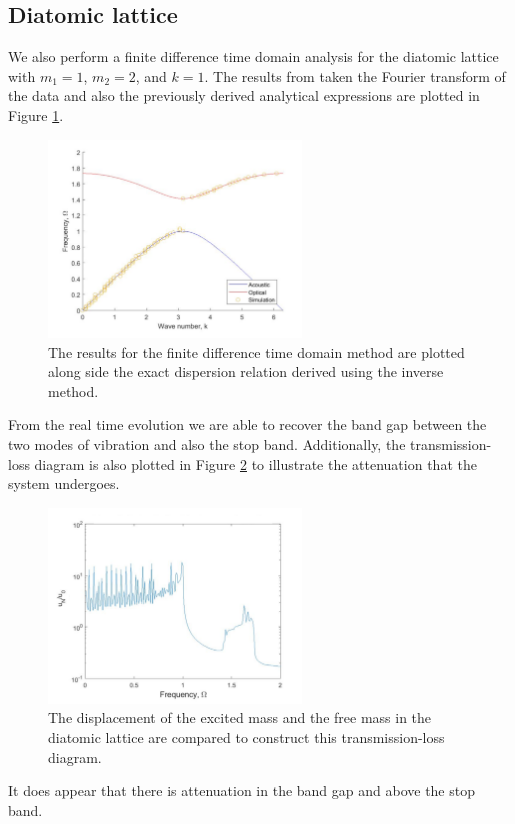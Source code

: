 \documentclass{article}
\begin{document}
\subsection{Diatomic lattice}
We also perform a finite difference time domain analysis for the diatomic 
lattice with $m_1=1$, $m_2=2$, and $k=1$. The results from taken the Fourier 
transform of the data and also the previously derived analytical expressions 
are plotted in Figure \ref{fig:diadr}.
\begin{figure}[!htbp]
	\centering
	\includegraphics[width=0.6\textwidth]{diatomic-dr.pdf}
	\caption{The results for the finite difference time domain method are 
	plotted along side the exact dispersion relation derived using the inverse 
	method.}
	\label{fig:diadr}
\end{figure}
From the real time evolution we are able to recover the band gap between the 
two modes of vibration and also the stop band. Additionally, the 
transmission-loss diagram is also plotted in Figure \ref{fig:tlds} to 
illustrate the attenuation that the system undergoes.
\begin{figure}[!htbp]
	\centering
	\includegraphics[width=0.6\textwidth]{dia-tl-diag.pdf}
	\caption{The displacement of the excited mass and the free mass in the 
	diatomic lattice are compared to construct this transmission-loss diagram.}
	\label{fig:tlds}
\end{figure}
It does appear that there is attenuation in the band gap and above the stop 
band. 
\end{document}
